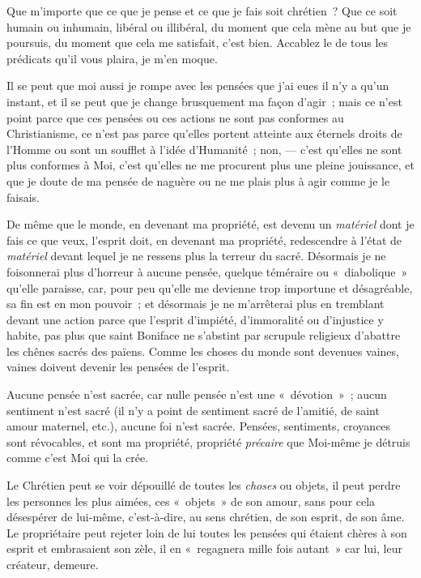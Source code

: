 \documentclass[french,twoside]{book} %
\begin{document}
\noindent Que m’importe que ce que je pense et ce que je fais soit chrétien ? Que ce soit humain ou inhumain, libéral ou illibéral, du moment que cela mène au but que je poursuis, du moment que cela me satisfait, c’est bien. Accablez le de tous les prédicats qu’il vous plaira, je m’en moque.\par
Il se peut que moi aussi je rompe avec les pensées que j’ai eues il n’y a qu’un instant, et il se peut que  je change brusquement ma façon d’agir ; mais ce n’est point parce que ces pensées ou ces actions ne sont pas conformes au Christianisme, ce n’est pas parce qu’elles portent atteinte aux éternels droits de l’Homme ou sont un soufflet à l’idée d’Humanité ; non, — c’est qu’elles ne sont plus conformes à Moi, c’est qu’elles ne me procurent plus une pleine jouissance, et que je doute de ma pensée de naguère ou ne me plais plus à agir comme je le faisais.\par
De même que le monde, en devenant ma propriété, est devenu un \emph{matériel} dont je fais ce que veux, l’esprit doit, en devenant ma propriété, redescendre à l’état de \emph{matériel} devant lequel je ne ressens plus la terreur du sacré. Désormais je ne foisonnerai plus d’horreur à aucune pensée, quelque téméraire ou « diabolique » qu’elle paraisse, car, pour peu qu’elle me devienne trop importune et désagréable, sa fin est en mon pouvoir ; et désormais je ne m’arrêterai plus en tremblant devant une action parce que l’esprit d’impiété, d’immoralité ou d’injustice y habite, pas plus que saint Boniface ne s’abstint par scrupule religieux d’abattre les chênes sacrés des païens. Comme les choses du monde sont devenues vaines, vaines doivent devenir les pensées de l’esprit.\par
Aucune pensée n’est sacrée, car nulle pensée n’est une « dévotion » ; aucun sentiment n’est sacré (il n’y a point de sentiment sacré de l’amitié, de saint amour maternel, etc.), aucune foi n’est sacrée. Pensées, sentiments, croyances sont révocables, et sont ma propriété, propriété \emph{précaire} que Moi-même je détruis comme c’est Moi qui la crée.\par
Le Chrétien peut se voir dépouillé de toutes les \emph{choses} ou objets, il peut perdre les personnes les plus aimées, ces « objets » de son amour, sans pour cela désespérer de lui-même, c’est-à-dire, au sens chrétien, de son esprit, de son âme. Le propriétaire peut rejeter loin de lui toutes les pensées qui étaient chères à son esprit et embrasaient son zèle, il en « regagnera  mille fois autant » car lui, leur créateur, demeure.\par
\end{document}
